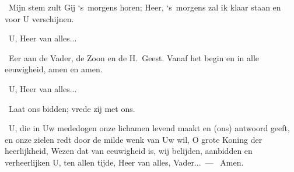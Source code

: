 \documentclass[12pt,twoside,a5paper]{article}
\begin{document}
\begin{halfparskip}
  \dd~Mijn stem zult Gij `s~morgens horen; Heer, `s~morgens zal ik klaar staan en voor U verschijnen.

  \rr~U, Heer van alles...

  \dd~Eer aan de Vader, de Zoon en de H.~Geest. Vanaf het begin en in alle eeuwigheid, amen en amen.

  \rr~U, Heer van alles...

  \dd~Laat ons bidden; vrede zij met ons.

  \cc~U, die in Uw mededogen onze lichamen levend maakt en (ons) antwoord geeft, en onze zielen redt door de milde wenk van Uw wil, O grote Koning der heerlijkheid, Wezen dat van eeuwigheid is, wij belijden, aanbidden en verheerlijken U, ten allen tijde, Heer van alles, Vader...~--- \rr~Amen.
\end{halfparskip}
\end{document}

